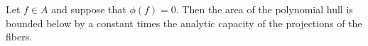
Let $f \in A$ and suppose that $\phi(f) = 0$. Then the area of the polynomial hull is bounded below by a constant times the analytic capacity of the projections of the fibers.
